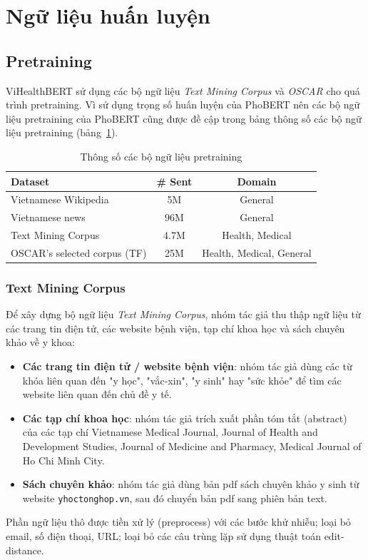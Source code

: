\section{Ngữ liệu huấn luyện}
\subsection{Pretraining}
ViHealthBERT sử dụng các bộ ngữ liệu \textit{Text Mining Corpus} và \textit{OSCAR} cho quá trình pretraining. Vì sử dụng trọng số huấn luyện của PhoBERT nên các bộ ngữ liệu pretraining của PhoBERT cũng được đề cập trong bảng thông số các bộ ngữ liệu pretraining (bảng~\ref{tab:pretraining-stats}).

\begin{table}
\centering
\begin{tabular}{|l|c|c|}
\hline
\textbf{Dataset} & \textbf{\# Sent} & \textbf{Domain} \\ \hline
Vietnamese Wikipedia & 5M & General \\ \hline
Vietnamese news & 96M & General \\ \hline
Text Mining Corpus & 4.7M & Health, Medical \\ \hline
OSCAR's selected corpus (TF) & 25M  & Health, Medical, General \\ \hline
\end{tabular}
\caption{Thông số các bộ ngữ liệu pretraining\cite{minh-EtAl:2022:LREC}}
\label{tab:pretraining-stats}
\end{table}

\subsubsection{Text Mining Corpus}
Để xây dựng bộ ngữ liệu \textit{Text Mining Corpus}, nhóm tác giả thu thập ngữ liệu từ các trang tin điện tử, các website bệnh viện, tạp chí khoa học và sách chuyên khảo về y khoa:
\begin{itemize}
\item \textbf{Các trang tin điện tử / website bệnh viện}: nhóm tác giả dùng các từ khóa liên quan đến "y học", "vắc-xin", "y sinh" hay "sức khỏe" để tìm các website liên quan đến chủ đề y tế.
\item \textbf{Các tạp chí khoa học}: nhóm tác giả trích xuất phần tóm tắt (abstract) của các tạp chí Vietnamese Medical Journal, Journal of Health and Development Studies, Journal of Medicine and Pharmacy, Medical Journal of Ho Chi Minh City.
\item \textbf{Sách chuyên khảo}: nhóm tác giả dùng bản pdf sách chuyên khảo y sinh từ website \texttt{yhoctonghop.vn}, sau đó chuyển bản pdf sang phiên bản text.
\end{itemize}
Phần ngữ liệu thô được tiền xử lý (preprocess) với các bước khử nhiễu; loại bỏ email, số điện thoại, URL; loại bỏ các câu trùng lặp sử dụng thuật toán edit-distance.


